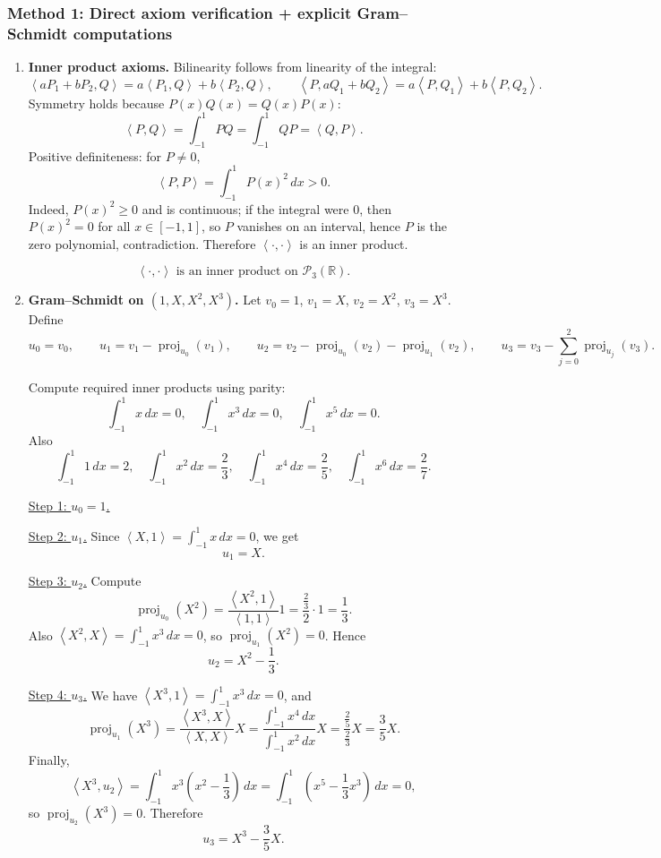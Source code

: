 \documentclass[12pt]{article}
\newcommand{\R}{\mathbb{R}}
\newcommand{\cP}{\mathcal{P}}
\DeclareMathOperator{\proj}{proj}
\newcommand{\ip}[2]{\left\langle #1,#2\right\rangle}
\begin{document}
\subsubsection{Method 1: Direct axiom verification + explicit Gram--Schmidt computations}
\begin{enumerate}[label=(\alph*)]
\item \textbf{Inner product axioms.}
Bilinearity follows from linearity of the integral:
\[
\ip{aP_1+bP_2}{Q}=a\ip{P_1}{Q}+b\ip{P_2}{Q},\qquad
\ip{P}{aQ_1+bQ_2}=a\ip{P}{Q_1}+b\ip{P}{Q_2}.
\]
Symmetry holds because $P(x)Q(x)=Q(x)P(x)$:
\[
\ip{P}{Q}=\int_{-1}^1 P Q=\int_{-1}^1 Q P=\ip{Q}{P}.
\]
Positive definiteness: for $P\neq 0$,
\[
\ip{P}{P}=\int_{-1}^1 P(x)^2\,dx>0.
\]
Indeed, $P(x)^2\ge 0$ and is continuous; if the integral were $0$, then $P(x)^2=0$ for all $x\in[-1,1]$, so $P$ vanishes on an interval,
hence $P$ is the zero polynomial, contradiction. Therefore $\ip{\cdot}{\cdot}$ is an inner product.

\[
\boxed{\,\ip{\cdot}{\cdot}\text{ is an inner product on }\cP_3(\R).\,}
\]

\item \textbf{Gram--Schmidt on $(1,X,X^2,X^3)$.}
Let $v_0=1$, $v_1=X$, $v_2=X^2$, $v_3=X^3$.
Define
\[
u_0=v_0,\qquad
u_1=v_1-\proj_{u_0}(v_1),\qquad
u_2=v_2-\proj_{u_0}(v_2)-\proj_{u_1}(v_2),\qquad
u_3=v_3-\sum_{j=0}^{2}\proj_{u_j}(v_3).
\]

Compute required inner products using parity:
\[
\int_{-1}^1 x\,dx=0,\quad \int_{-1}^1 x^3\,dx=0,\quad \int_{-1}^1 x^5\,dx=0.
\]
Also
\[
\int_{-1}^1 1\,dx=2,\quad \int_{-1}^1 x^2\,dx=\frac{2}{3},\quad \int_{-1}^1 x^4\,dx=\frac{2}{5},\quad \int_{-1}^1 x^6\,dx=\frac{2}{7}.
\]

\underline{Step 1: $u_0=1$.}

\underline{Step 2: $u_1$.}
Since $\ip{X}{1}=\int_{-1}^1 x\,dx=0$, we get
\[
u_1=X.
\]

\underline{Step 3: $u_2$.}
Compute
\[
\proj_{u_0}(X^2)=\frac{\ip{X^2}{1}}{\ip{1}{1}}1=\frac{\frac{2}{3}}{2}\cdot 1=\frac{1}{3}.
\]
Also $\ip{X^2}{X}=\int_{-1}^1 x^3\,dx=0$, so $\proj_{u_1}(X^2)=0$.
Hence
\[
u_2=X^2-\frac{1}{3}.
\]

\underline{Step 4: $u_3$.}
We have $\ip{X^3}{1}=\int_{-1}^1 x^3\,dx=0$, and
\[
\proj_{u_1}(X^3)=\frac{\ip{X^3}{X}}{\ip{X}{X}}X
=\frac{\int_{-1}^1 x^4\,dx}{\int_{-1}^1 x^2\,dx}X
=\frac{\frac{2}{5}}{\frac{2}{3}}X=\frac{3}{5}X.
\]
Finally,
\[
\ip{X^3}{u_2}=\int_{-1}^1 x^3\left(x^2-\frac13\right)\,dx
=\int_{-1}^1 \left(x^5-\frac13 x^3\right)\,dx=0,
\]
so $\proj_{u_2}(X^3)=0$. Therefore
\[
u_3=X^3-\frac{3}{5}X.
\]


\end{enumerate}
\end{document}
